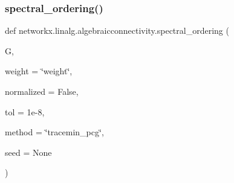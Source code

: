 \subsubsection{\texorpdfstring{spectral\+\_\+ordering()}{spectral\_ordering()}}
{\footnotesize\ttfamily def networkx.\+linalg.\+algebraicconnectivity.\+spectral\+\_\+ordering (\begin{DoxyParamCaption}\item[{}]{G,  }\item[{}]{weight = {\ttfamily \char`\"{}weight\char`\"{}},  }\item[{}]{normalized = {\ttfamily False},  }\item[{}]{tol = {\ttfamily 1e-\/8},  }\item[{}]{method = {\ttfamily \char`\"{}tracemin\+\_\+pcg\char`\"{}},  }\item[{}]{seed = {\ttfamily None} }\end{DoxyParamCaption})}

